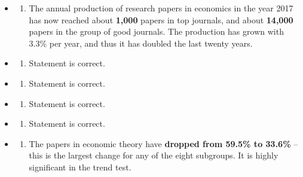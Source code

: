 \documentclass[
  12pt,
  oneside]{book}
\providecommand{\tightlist}{%
  \setlength{\itemsep}{0pt}\setlength{\parskip}{0pt}}
\theoremstyle{definition}
\theoremstyle{definition}
\theoremstyle{definition}
\theoremstyle{definition}
\theoremstyle{remark}
\begin{document}
\begin{itemize}
\item
  \begin{enumerate}
  \def\labelenumi{\roman{enumi})}
  \tightlist
  \item
    The annual production of research papers in economics in the year 2017 has now reached about \textbf{1,000} papers in top journals, and about \textbf{14,000} papers in the group of good journals. The production has grown with 3.3\% per year, and thus it has doubled the last twenty years.
  \end{enumerate}
\item
  \begin{enumerate}
  \def\labelenumi{\roman{enumi})}
  \setcounter{enumi}{1}
  \tightlist
  \item
    Statement is correct.
  \end{enumerate}
\item
  \begin{enumerate}
  \def\labelenumi{\roman{enumi})}
  \setcounter{enumi}{2}
  \tightlist
  \item
    Statement is correct.
  \end{enumerate}
\item
  \begin{enumerate}
  \def\labelenumi{\roman{enumi})}
  \setcounter{enumi}{3}
  \tightlist
  \item
    Statement is correct.
  \end{enumerate}
\item
  \begin{enumerate}
  \def\labelenumi{\alph{enumi})}
  \setcounter{enumi}{21}
  \tightlist
  \item
    Statement is correct.
  \end{enumerate}
\item
  \begin{enumerate}
  \def\labelenumi{\roman{enumi})}
  \setcounter{enumi}{5}
  \tightlist
  \item
    The papers in economic theory have \textbf{dropped from 59.5\% to 33.6\%} -- this is the largest change for any of the eight subgroups. It is highly significant in the trend test.
  \end{enumerate}
\end{itemize}
\end{document}
